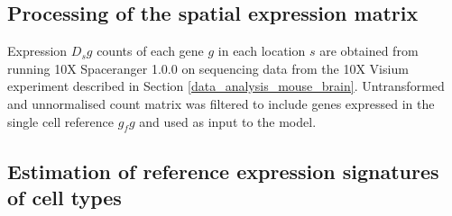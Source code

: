 \documentclass[11pt,a4paper]{article}
\begin{document}
\subsection{Processing of the spatial expression matrix} \label{c2l_sp_proc}
Expression $D_sg$ counts of each gene $g$ in each location $s$ are obtained from running 10X Spaceranger 1.0.0 on sequencing data from the 10X Visium experiment described in Section \ref{data_analysis_mouse_brain}. Untransformed and unnormalised count matrix was filtered to include genes expressed in the single cell reference $g_fg$ and used as input to the model.

\subsection{Estimation of reference expression signatures of cell types} \label{c2l_ref_prog}
\end{document}
